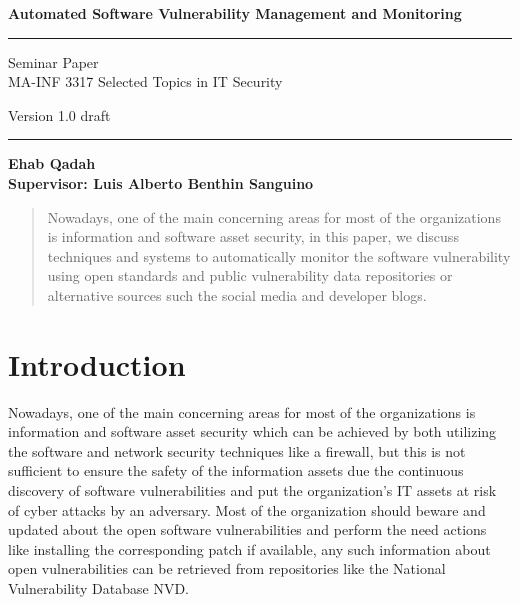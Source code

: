 \documentclass{llncs}
\begin{document}
\begin{flushleft}
 
\centering\LARGE {\bf Automated Software Vulnerability Management and Monitoring }


\rule{\textwidth}{1pt}

\vspace{2pt}


\centering
 Seminar Paper  
 \\MA-INF 3317 Selected Topics in IT Security

{\Large Version 1.0 draft }


\end{flushleft}

\rule{\textwidth}{1pt}

\vspace{8 cm}

\centering
 \bf Ehab Qadah\\
 
 \vspace{7 pt}
\bf Supervisor: Luis Alberto Benthin Sanguino

\newpage

\tableofcontents

\newpage


\begin{abstract}
Nowadays, one of the main concerning areas for most of the organizations is information and software asset security, in this paper, we discuss techniques and systems to automatically monitor the software vulnerability using open standards and public vulnerability data repositories or alternative sources such the social media and developer blogs. 
\end{abstract}

\section{Introduction}

\par Nowadays, one of the main concerning areas for most of the organizations is information and software asset security which can be achieved by both utilizing the software and network security techniques like a firewall, but this is not sufficient to ensure the safety of the information assets due the continuous discovery of software vulnerabilities and put the organization's IT assets at risk of cyber attacks by an adversary. Most of the organization should beware and updated about the open software vulnerabilities and perform the need actions like installing the corresponding patch if available, any such information about open vulnerabilities can be retrieved from repositories like the National Vulnerability Database NVD.
 
\end{document}
